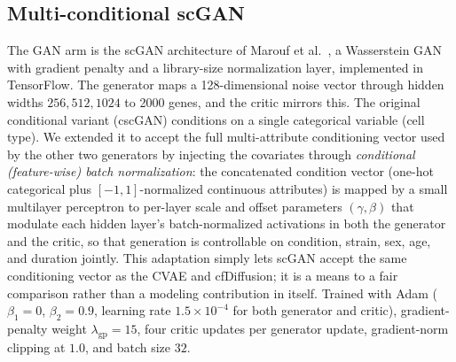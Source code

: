 \documentclass[11pt]{article}
\begin{document}
\subsection{Multi-conditional scGAN}
The GAN arm is the scGAN architecture of Marouf et al.\ \cite{scgan}, a Wasserstein GAN with gradient penalty and a library-size normalization layer, implemented in TensorFlow. The generator maps a 128-dimensional noise vector through hidden widths $256,512,1024$ to 2000 genes, and the critic mirrors this. The original conditional variant (cscGAN) conditions on a single categorical variable (cell type). We extended it to accept the full multi-attribute conditioning vector used by the other two generators by injecting the covariates through \emph{conditional (feature-wise) batch normalization}: the concatenated condition vector (one-hot categorical plus $[-1,1]$-normalized continuous attributes) is mapped by a small multilayer perceptron to per-layer scale and offset parameters $(\gamma,\beta)$ that modulate each hidden layer's batch-normalized activations in both the generator and the critic, so that generation is controllable on condition, strain, sex, age, and duration jointly. This adaptation simply lets scGAN accept the same conditioning vector as the CVAE and cfDiffusion; it is a means to a fair comparison rather than a modeling contribution in itself. Trained with Adam ($\beta_1=0$, $\beta_2=0.9$, learning rate $1.5\times10^{-4}$ for both generator and critic), gradient-penalty weight $\lambda_{\mathrm{gp}}=15$, four critic updates per generator update, gradient-norm clipping at $1.0$, and batch size $32$.
\end{document}
